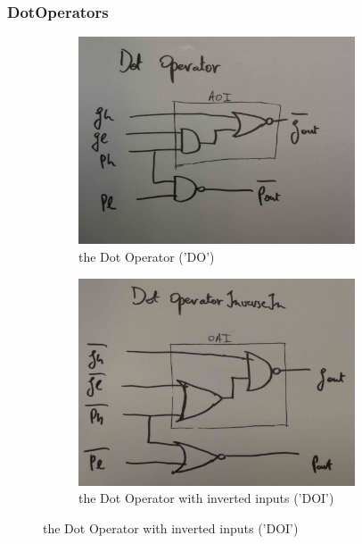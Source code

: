 \documentclass[english]{article}
\begin{document}
\subsubsection{DotOperators}


\begin{figure}[h!]
\centering
\begin{subfigure}{.5\textwidth}
  \centering
  \includegraphics[width=0.9\textwidth]{figures/do}
\caption{the Dot Operator ('DO')}
\label{DO}
\end{subfigure}%
\begin{subfigure}{.5\textwidth}
  \centering
  \includegraphics[width=0.9\textwidth]{figures/doi}
\caption{the Dot Operator with inverted inputs ('DOI')} 
\label{DOI}
\end{subfigure}
\end{figure}
\end{document}
